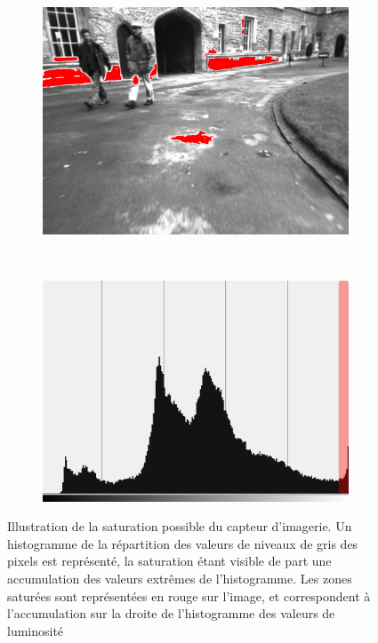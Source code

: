 \begin{figure}
	\begin{center}
		\begin{subfigure}{0.48\textwidth}
			\includegraphics[width=\textwidth]{Chapter3/graphics/NewCollege_overexposed.png} 
		\end{subfigure}
		~
		\begin{subfigure}{0.48\textwidth}
			\includegraphics[width=\textwidth]{Chapter3/graphics/NewCollege_histogram_red.png} 
		\end{subfigure}
		
		\caption{Illustration de la saturation possible du capteur d'imagerie. Un histogramme de la répartition des valeurs de niveaux de gris des pixels est représenté, la saturation étant visible de part une accumulation des valeurs extrêmes de l'histogramme. Les zones saturées sont représentées en rouge sur l'image, et correspondent à l'accumulation sur la droite de l'histogramme des valeurs de luminosité}	
		\label{fig:ch3_saturated_pic}
	\end{center}
\end{figure}

